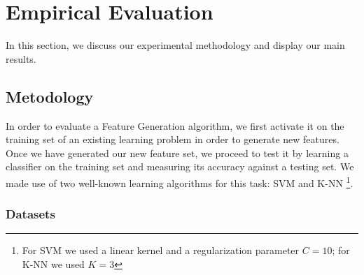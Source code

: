 \documentclass[twoside,11pt]{article}
\theoremstyle{definition}
\begin{document}
\section{Empirical Evaluation}
In this section, we discuss our experimental methodology and display our main results.

\subsection{Metodology}

In order to evaluate a Feature Generation algorithm, we first activate it on the training set of an existing learning problem in order to generate new features. Once we have generated our new feature set, we proceed to test it by learning a classifier on the training set and measuring its accuracy against a testing set. We made use of two well-known learning algorithms for this task: SVM \cite{cortes1995support} and K-NN \cite{fix1951discriminatory}\footnote{For SVM we used a linear kernel and a regularization parameter $C=10$; for K-NN we used $K=3$}.

\subsubsection{Datasets}
\end{document}
